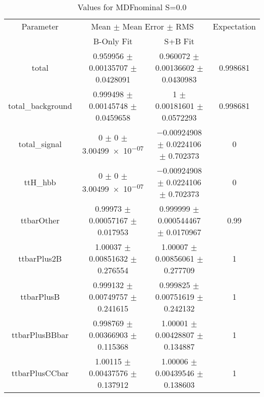 \begin{table}
\centering
\caption{Values for MDFnominal S=0.0}
\begin{tabular}{cccc}
\toprule
Parameter & \multicolumn{2}{c}{Mean $\pm$ Mean Error $\pm$ RMS} & Expectation\\
 & B-Only Fit & S+B Fit & \\
\midrule
total & \num{0.959956} $\pm$ \num{0.00135707} $\pm$ \num{0.0428091} & \num{0.960072} $\pm$ \num{0.00136602} $\pm$ \num{0.0430983} & \num{0.998681}\\
total\_background & \num{0.999498} $\pm$ \num{0.00145748} $\pm$ \num{0.0459658} & \num{1} $\pm$ \num{0.00181601} $\pm$ \num{0.0572293} & \num{0.998681}\\
total\_signal & \num{0} $\pm$ \num{0} $\pm$ \num{3.00499e-07} & \num{-0.00924908} $\pm$ \num{0.0224106} $\pm$ \num{0.702373} & \num{0}\\
ttH\_hbb & \num{0} $\pm$ \num{0} $\pm$ \num{3.00499e-07} & \num{-0.00924908} $\pm$ \num{0.0224106} $\pm$ \num{0.702373} & \num{0}\\
ttbarOther & \num{0.99973} $\pm$ \num{0.00057167} $\pm$ \num{0.017953} & \num{0.999999} $\pm$ \num{0.000544467} $\pm$ \num{0.0170967} & \num{0.99}\\
ttbarPlus2B & \num{1.00037} $\pm$ \num{0.00851632} $\pm$ \num{0.276554} & \num{1.00007} $\pm$ \num{0.00856061} $\pm$ \num{0.277709} & \num{1}\\
ttbarPlusB & \num{0.999132} $\pm$ \num{0.00749757} $\pm$ \num{0.241615} & \num{0.999825} $\pm$ \num{0.00751619} $\pm$ \num{0.242132} & \num{1}\\
ttbarPlusBBbar & \num{0.998769} $\pm$ \num{0.00366903} $\pm$ \num{0.115368} & \num{1.00001} $\pm$ \num{0.00428807} $\pm$ \num{0.134887} & \num{1}\\
ttbarPlusCCbar & \num{1.00115} $\pm$ \num{0.00437576} $\pm$ \num{0.137912} & \num{1.00006} $\pm$ \num{0.00439546} $\pm$ \num{0.138603} & \num{1}\\
\bottomrule
\end{tabular}
\end{table}